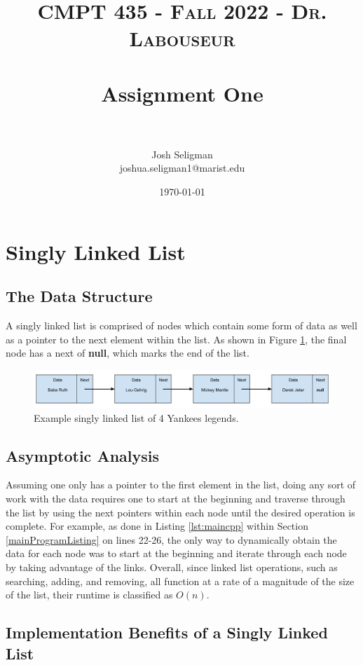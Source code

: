 \documentclass[letterpaper, 10pt,DIV=13]{scrartcl}
\title{	
   \normalfont \normalsize 
   \textsc{CMPT 435 - Fall 2022 - Dr. Labouseur} \\[10pt] %
   \horrule{0.5pt} \\[0.25cm] 	%
   \huge Assignment One  \\     	    %
   \horrule{0.5pt} \\[0.25cm] 	%
}
\author{Josh Seligman \\ \normalsize joshua.seligman1@marist.edu}
\date{\normalsize\today} 	%
\numberwithin{equation}{section} %
\numberwithin{figure}{section} %
\numberwithin{table}{section} %
\begin{document}
\maketitle %

\section{Singly Linked List}\label{linkedListSection}
\subsection{The Data Structure}\label{linkedListDataStructure}
A singly linked list is comprised of nodes which contain some form of data as well as a pointer to the next element within the list. As shown in Figure \ref{figure:linkedList}, the final node has a next of \textbf{null}, which marks the end of the list.

\begin{figure}[ht] 
    \centering 
    \includegraphics[width=15cm]{linkedList}
    \caption{Example singly linked list of 4 Yankees legends.}
    \label{figure:linkedList}
 \end{figure}

\subsection{Asymptotic Analysis}
Assuming one only has a pointer to the first element in the list, doing any sort of work with the data requires one to start at the beginning and traverse through the list by using the next pointers within each node until the desired operation is complete. For example, as done in Listing \ref{lst:maincpp} within Section \ref{mainProgramListing} on lines 22-26, the only way to dynamically obtain the data for each node was to start at the beginning and iterate through each node by taking advantage of the links. Overall, since linked list operations, such as searching, adding, and removing, all function at a rate of a magnitude of the size of the list, their runtime is classified as $O(n)$.

\subsection{Implementation Benefits of a Singly Linked List}
\end{document}
